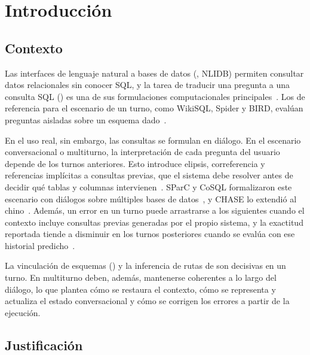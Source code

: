 \section{Introducción}
\label{sec:introduccion}

\subsection{Contexto}
\label{sec:intro-contexto}

Las interfaces de lenguaje natural a bases de datos (, NLIDB) permiten consultar datos relacionales sin conocer SQL, y la tarea de traducir una pregunta a una consulta SQL () es una de sus formulaciones computacionales principales~\cite{Quamar2022NLI,Shi2026SurveyLLM}. Los  de referencia para el escenario de un turno, como WikiSQL, Spider y BIRD, evalúan preguntas aisladas sobre un esquema dado~\cite{Zhong2017Seq2SQL,Yu2018Spider,Li2023BIRD}.

En el uso real, sin embargo, las consultas se formulan en diálogo. En el escenario conversacional o multiturno, la interpretación de cada pregunta del usuario depende de los turnos anteriores. Esto introduce elipsis, correferencia y referencias implícitas a consultas previas, que el sistema debe resolver antes de decidir qué tablas y columnas intervienen~\cite{Li2020ContextSurvey}. SParC y CoSQL formalizaron este escenario con diálogos sobre múltiples bases de datos~\cite{Yu2019SParC,Yu2019CoSQL}, y CHASE lo extendió al chino~\cite{Guo2021Chase}. Además, un error en un turno puede arrastrarse a los siguientes cuando el contexto incluye consultas previas generadas por el propio sistema, y la exactitud reportada tiende a disminuir en los turnos posteriores cuando se evalúa con ese historial predicho~\cite{Cai2020IGSQL,Wang2021Tracking,Fu2023MIGA}.

La vinculación de esquemas () y la inferencia de rutas de  son decisivas en un turno. En multiturno deben, además, mantenerse coherentes a lo largo del diálogo, lo que plantea cómo se restaura el contexto, cómo se representa y actualiza el estado conversacional y cómo se corrigen los errores a partir de la ejecución.

\subsection{Justificación}
\label{sec:intro-justificacion}

